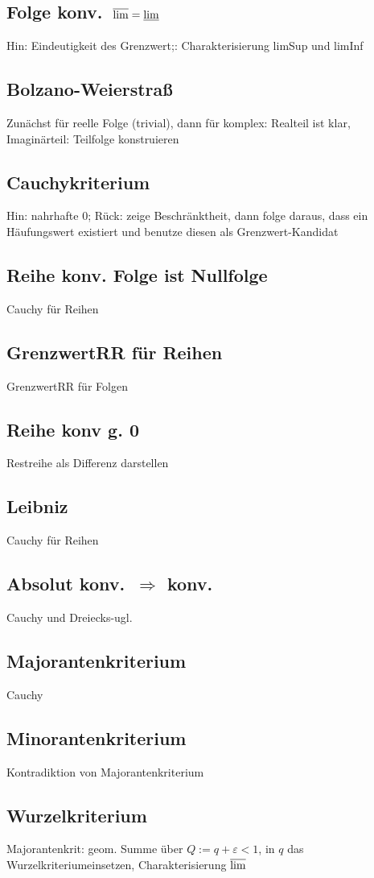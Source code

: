 \subsection{Folge konv.\ $\varlimsup = \varliminf$ }
 Hin: Eindeutigkeit des Grenzwert;: Charakterisierung limSup und limInf
\subsection{Bolzano-Weierstraß }
 Zunächst für reelle Folge (trivial), dann für komplex: Realteil ist klar, Imaginärteil: Teilfolge konstruieren
\subsection{Cauchykriterium }
 Hin: nahrhafte 0; Rück: zeige Beschränktheit, dann folge daraus, dass ein Häufungswert existiert und benutze diesen als Grenzwert-Kandidat
\subsection{Reihe konv.  Folge ist Nullfolge }
 Cauchy für Reihen
\subsection{GrenzwertRR für Reihen }
 GrenzwertRR für Folgen
\subsection{Reihe konv g. 0 }
 Restreihe als Differenz darstellen
\subsection{Leibniz }
 Cauchy für Reihen
\subsection{Absolut konv.\ $\Rightarrow$  konv. }
 Cauchy und Dreiecks-ugl.
\subsection{Majorantenkriterium }
 Cauchy
\subsection{Minorantenkriterium }
 Kontradiktion von Majorantenkriterium
\subsection{Wurzelkriterium }
 Majorantenkrit: geom. Summe über $Q:=q+\varepsilon<1$, in $q$ das Wurzelkriteriumeinsetzen, Charakterisierung $\varlimsup$
